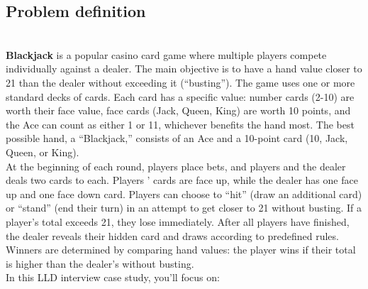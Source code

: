 

\subsection{Problem definition}\label{KfyitG1dioESlbYIcgWus-1}
\\
\textbf{Blackjack} is a popular casino card game where multiple players compete individually against a dealer. The main objective is to have a hand value closer to 21 than the dealer without exceeding it (``busting''). The game uses one or more standard decks of cards. Each card has a specific value: number cards (2-10) are worth their face value, face cards (Jack, Queen, King) are worth 10 points, and the Ace can count as either 1 or 11, whichever benefits the hand most. The best possible hand, a ``Blackjack,'' consists of an Ace and a 10-point card (10, Jack, Queen, or King).
\\
At the beginning of each round, players place bets, and players and the dealer deals two cards to each. Players ' cards are face up, while the dealer has one face up and one face down card. Players can choose to ``hit'' (draw an additional card) or ``stand'' (end their turn) in an attempt to get closer to 21 without busting. If a player's total exceeds 21, they lose immediately. After all players have finished, the dealer reveals their hidden card and draws according to predefined rules. Winners are determined by comparing hand values: the player wins if their total is higher than the dealer's without busting.
\\
In this LLD interview case study, you'll focus on:

